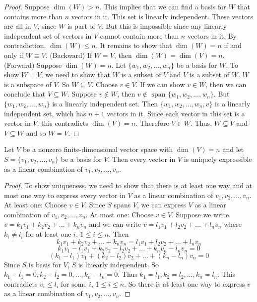 \documentclass[12pt]{article}
\begin{document}
\begin{proof} Suppose $\dim(W) > n$. This implies that we can find a basis for $W$ that contains more than $n$ vectors in it. This set is linearly independent. These vectors are all in $V$, since $W$ is part of $V$. But this is impossible since any linearly independent set of vectors in $V$ cannot contain more than $n$ vectors in it. By contradiction, $\dim(W) \leq n$. It remains to show that $\dim(W) = n$ if and only if $W \equiv V$. \newline (Backward) If $W = V$, then $\dim(W) = \dim(V) = n$. \newline (Forward) Suppose $\dim(W) = n$. Let $\{w_1, w_2, \dots, w_n\}$ be a basis for $W$. To show $W = V$, we need to show that $W$ is a subset of $V$ and $V$ is a subset of $W$. $W$ is a subspace of $V$. So $W \subseteq V$. Choose $v \in V$. If we can show $v \in W$, then we can conclude that $V \subseteq W$. Suppose $v \notin W$, then $v \notin \text{ span } \{w_1, w_2, \dots, w_n\}$. But $\{w_1, w_2, \dots, w_n\}$ is a linearly independent set. Then $\{w_1, w_2, \dots, w_n, v\}$ is a linearly independent set, which has $n + 1$ vectors in it. Since each vector in this set is a vector in $V$, this contradicts $\dim(V) = n$. Therefore $V \in W$. Thus, $W \subseteq V$ and $V \subseteq W$ and so $W = V$. \end{proof} 
\begin{theorem} Let $V$ be a nonzero finite-dimensional vector space with $\dim(V) = n$ and let $S = \{v_1, v_2, \dots, v_n\}$ be a basis for $V$. Then every vector in $V$ is uniquely expressible as a linear combination of $v_1, v_2, \dots, v_n$. \end{theorem} 
\begin{proof} To show uniqueness, we need to show that there is at least one way and at most one way to express every vector in $V$ as a linear combination of $v_1, v_2, \dots, v_n$. \newline At least one: Choose $v \in V$. Since $S$ spans $V$, we can express $V$ as a linear combination of $v_1, v_2, \dots, v_n$. \newline At most one: Choose $v \in V$. Suppose we write $v = k_1v_1 + k_2v_2 + \dots + k_nv_n$ and we can write $v = l_1v_1 + l_2v_2 + \dots + l_nv_n$ where $k_i \neq l_i$ for at least one $i$, $1 \leq i \leq n$. Then $$k_1v_1 + k_2v_2 + \dots + k_nv_n = l_1v_1 + l_2v_2 + \dots + l_nv_n $$ $$ k_1v_1 - l_1v_1 + k_2v_2 - l_2v_2 + \dots + k_nv_n - l_nv_n = 0 $$ $$ (k_1 - l_1)v_1 + (k_2 - l_2)v_2 + \dots + (k_n - l_n)v_n = 0 $$ Since $S$ is basis for $V$, $S$ is linearly independent. So $k_1 - l_1 = 0, k_2 - l_2 = 0, \dots, k_n - l_n = 0$. Thus $k_1 = l_1, k_2 = l_2, \dots, k_n = l_n$. This contradicts $v_i \leq l_i$ for some $i$, $1 \leq i \leq n$. So there is at least one way to express $v$ as a linear combination of $v_1, v_2, \dots, v_n$. \end{proof} 
\end{document}
